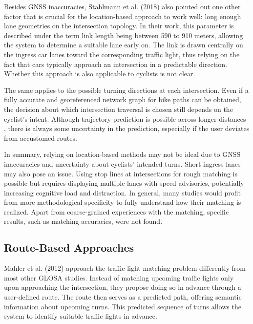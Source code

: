 Besides GNSS inaccuracies, Stahlmann et al. (2018) \cite{stahlmann_exploring_2018} also pointed out one other factor that is crucial for the location-based approach to work well: long enough lane geometries on the intersection topology. In their work, this parameter is described under the term link length being between 590 to 910 meters, allowing the system to determine a suitable lane early on. The link is drawn centrally on the ingress car lanes toward the corresponding traffic light, thus relying on the fact that cars typically approach an intersection in a predictable direction. Whether this approach is also applicable to cyclists is not clear. 

The same applies to the possible turning directions at each intersection. Even if a fully accurate and georeferenced network graph for bike paths can be obtained, the decision about which intersection traversal is chosen still depends on the cyclist's intent. Although trajectory prediction is possible across longer distances \cite{rudenko_human_2020}, there is always some uncertainty in the prediction, especially if the user deviates from accustomed routes.

In summary, relying on location-based methods may not be ideal due to GNSS inaccuracies and uncertainty about cyclists' intended turns. Short ingress lanes may also pose an issue. Using stop lines at intersections for rough matching is possible but requires displaying multiple lanes with speed advisories, potentially increasing cognitive load and distraction. In general, many studies would profit from more methodological specificity to fully understand how their matching is realized. Apart from coarse-grained experiences with the matching, specific results, such as matching accuracies, were not found.

\subsection{Route-Based Approaches}

Mahler et al. (2012) \cite{mahler_reducing_2012} approach the traffic light matching problem differently from most other GLOSA studies. Instead of matching upcoming traffic lights only upon approaching the intersection, they propose doing so in advance through a user-defined route. The route then serves as a predicted path, offering semantic information about upcoming turns. This predicted sequence of turns allows the system to identify suitable traffic lights in advance. 

